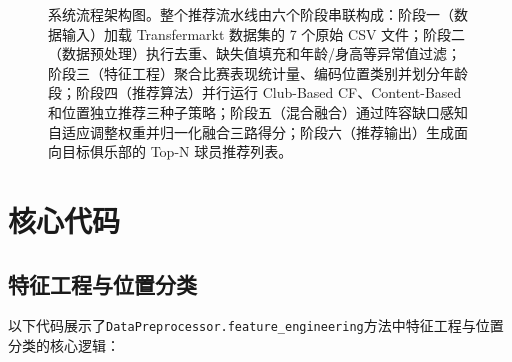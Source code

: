 \documentclass[a4paper]{article}
\begin{document}
\begin{figure}[H]
\caption{系统流程架构图。整个推荐流水线由六个阶段串联构成：阶段一（数据输入）加载 Transfermarkt 数据集的 7 个原始 CSV 文件；阶段二（数据预处理）执行去重、缺失值填充和年龄/身高等异常值过滤；阶段三（特征工程）聚合比赛表现统计量、编码位置类别并划分年龄段；阶段四（推荐算法）并行运行 Club-Based CF、Content-Based 和位置独立推荐三种子策略；阶段五（混合融合）通过阵容缺口感知自适应调整权重并归一化融合三路得分；阶段六（推荐输出）生成面向目标俱乐部的 Top-N 球员推荐列表。}
\label{fig:pipeline}
\end{figure}


\section{核心代码}

\subsection{特征工程与位置分类}

以下代码展示了\texttt{DataPreprocessor.feature\_engineering}方法中特征工程与位置分类的核心逻辑：
\end{document}
